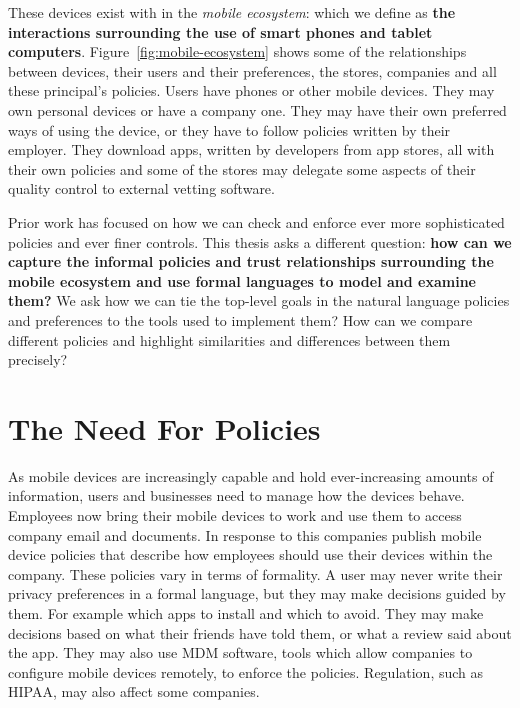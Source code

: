 \documentclass[thesis.tex]{subfiles}
\begin{document}
These devices exist with in the \emph{mobile ecosystem}: which we define as
\textbf{the interactions surrounding the use of smart phones and tablet
computers}. Figure~\ref{fig:mobile-ecosystem} shows some of the relationships
between devices, their users and their preferences, the stores, companies and
all these principal's policies. Users have phones or other mobile devices. They
may own personal devices or have a company one. They may have their own
preferred ways of using the device, or they have to follow policies written
by their employer. They download apps, written by developers from app stores,
all with their own policies and some of the stores may delegate some aspects of
their quality control to external vetting software.

Prior work has focused on how we can check and enforce ever more sophisticated
policies and ever finer controls. This thesis asks a different question:
\textbf{how can we capture the informal policies and trust relationships
surrounding the mobile ecosystem and use formal languages to model and examine
them?} We ask how we can tie the top-level goals in the natural language
policies and preferences to the tools used to implement them? How can we compare
different policies and highlight similarities and differences between them
precisely?

\section{The Need For Policies}

As mobile devices are increasingly capable and hold ever-increasing amounts of
information, users and businesses need to manage how the devices
behave. Employees now bring their mobile devices to work and use them to access
company email and documents. In response to this companies publish mobile device
policies that describe how employees should use their devices within the company. These
policies vary in terms of formality. A user may never write their privacy
preferences in a formal language, but they may make decisions guided by them.
For example which apps to install and which to avoid. They may make decisions
based on what their friends have told them, or what a review said about the app.
They may also use \ac{MDM} software, tools which allow companies to configure
mobile devices remotely, to enforce the policies. Regulation, such as
\ac{HIPAA}, may also affect some companies.
\end{document}
